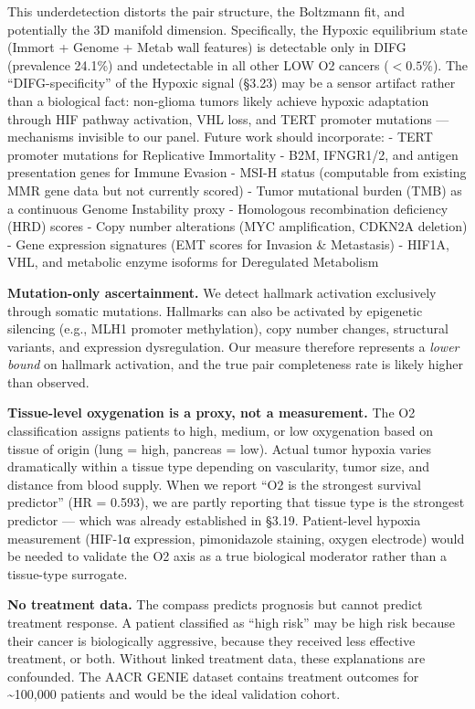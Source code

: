 \documentclass[
  11pt,
]{article}
\begin{document}
This underdetection distorts the pair structure, the Boltzmann fit, and
potentially the 3D manifold dimension. Specifically, the Hypoxic
equilibrium state (Immort + Genome + Metab wall features) is detectable
only in DIFG (prevalence 24.1\%) and undetectable in all other LOW O2
cancers (\(< 0.5\%\)). The ``DIFG-specificity'' of the Hypoxic signal
(§3.23) may be a sensor artifact rather than a biological fact:
non-glioma tumors likely achieve hypoxic adaptation through HIF pathway
activation, VHL loss, and TERT promoter mutations --- mechanisms
invisible to our panel. Future work should incorporate: - TERT promoter
mutations for Replicative Immortality - B2M, IFNGR1/2, and antigen
presentation genes for Immune Evasion - MSI-H status (computable from
existing MMR gene data but not currently scored) - Tumor mutational
burden (TMB) as a continuous Genome Instability proxy - Homologous
recombination deficiency (HRD) scores - Copy number alterations (MYC
amplification, CDKN2A deletion) - Gene expression signatures (EMT scores
for Invasion \& Metastasis) - HIF1A, VHL, and metabolic enzyme isoforms
for Deregulated Metabolism

\textbf{Mutation-only ascertainment.} We detect hallmark activation
exclusively through somatic mutations. Hallmarks can also be activated
by epigenetic silencing (e.g., MLH1 promoter methylation), copy number
changes, structural variants, and expression dysregulation. Our measure
therefore represents a \emph{lower bound} on hallmark activation, and
the true pair completeness rate is likely higher than observed.

\textbf{Tissue-level oxygenation is a proxy, not a measurement.} The O2
classification assigns patients to high, medium, or low oxygenation
based on tissue of origin (lung = high, pancreas = low). Actual tumor
hypoxia varies dramatically within a tissue type depending on
vascularity, tumor size, and distance from blood supply. When we report
``O2 is the strongest survival predictor'' (HR = 0.593), we are partly
reporting that tissue type is the strongest predictor --- which was
already established in §3.19. Patient-level hypoxia measurement (HIF-1α
expression, pimonidazole staining, oxygen electrode) would be needed to
validate the O2 axis as a true biological moderator rather than a
tissue-type surrogate.

\textbf{No treatment data.} The compass predicts prognosis but cannot
predict treatment response. A patient classified as ``high risk'' may be
high risk because their cancer is biologically aggressive, because they
received less effective treatment, or both. Without linked treatment
data, these explanations are confounded. The AACR GENIE dataset contains
treatment outcomes for \textasciitilde100,000 patients and would be the
ideal validation cohort.
\end{document}
